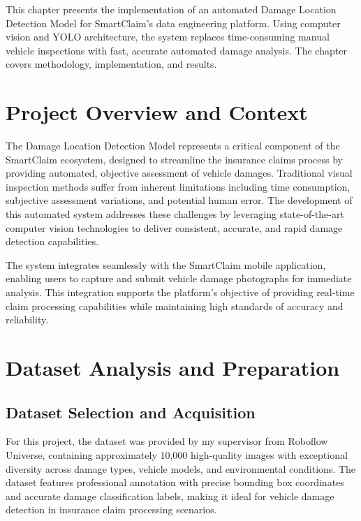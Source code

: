 \documentclass[12pt,a4paper]{report}
\begin{document}
This chapter presents the implementation of an automated Damage Location Detection Model for SmartClaim's data engineering platform. Using computer vision and YOLO architecture, the system replaces time-consuming manual vehicle inspections with fast, accurate automated damage analysis. The chapter covers methodology, implementation, and results.

\section{Project Overview and Context}


The Damage Location Detection Model represents a critical component of the SmartClaim ecosystem, designed to streamline the insurance claims process by providing automated, objective assessment of vehicle damages. Traditional visual inspection methods suffer from inherent limitations including time consumption, subjective assessment variations, and potential human error. The development of this automated system addresses these challenges by leveraging state-of-the-art computer vision technologies to deliver consistent, accurate, and rapid damage detection capabilities.

The system integrates seamlessly with the SmartClaim mobile application, enabling users to capture and submit vehicle damage photographs for immediate analysis. This integration supports the platform's objective of providing real-time claim processing capabilities while maintaining high standards of accuracy and reliability.



\section{Dataset Analysis and Preparation}

\subsection{Dataset Selection and Acquisition}

For this project, the dataset was provided by my supervisor from Roboflow Universe, containing approximately 10,000 high-quality images with exceptional diversity across damage types, vehicle models, and environmental conditions. The dataset features professional annotation with precise bounding box coordinates and accurate damage classification labels, making it ideal for vehicle damage detection in insurance claim processing scenarios.
\end{document}
